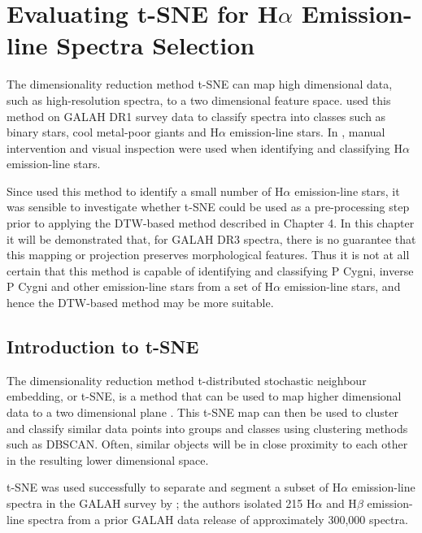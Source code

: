 \chapter{Evaluating t-SNE for H$\alpha$ Emission-line Spectra Selection}

The dimensionality reduction method t-SNE can map high dimensional data, such as high-resolution spectra, to a two dimensional feature space. \citet{traven2017galah} used this method on GALAH DR1 survey data to classify spectra into classes such as binary stars, cool metal-poor giants and H$\alpha$ emission-line stars. In \citet{traven2017galah}, manual intervention and visual inspection were used when identifying and classifying H$\alpha$ emission-line stars.

Since \citeauthor{traven2017galah} used this method to identify a small number of H$\alpha$ emission-line stars, it was sensible to investigate whether t-SNE could be used as a pre-processing step prior to applying the DTW-based method described in Chapter 4. In this chapter it will be demonstrated that, for GALAH DR3 spectra, there is no guarantee that this mapping or projection preserves morphological features. Thus it is not at all certain that this method is capable of identifying and classifying P Cygni, inverse P Cygni and other emission-line stars from a set of H$\alpha$ emission-line stars, and hence the DTW-based method may be more suitable.

\section{Introduction to t-SNE}

The dimensionality reduction method t-distributed stochastic neighbour embedding, or t-SNE, is a method that can be used to map higher dimensional data to a two dimensional plane \citep{van2008visualizing} . This t-SNE map can then be used to cluster and classify similar data points into groups and classes using clustering methods such as DBSCAN. Often, similar objects will be in close proximity to each other in the resulting lower dimensional space.

t-SNE was used successfully to separate and segment a subset of H$\alpha$ emission-line spectra in the GALAH survey by \citet{traven2017galah}; the authors isolated 215 H$\alpha$ and H$\beta$ emission-line spectra from a prior GALAH data release of approximately 300,000 spectra. %

